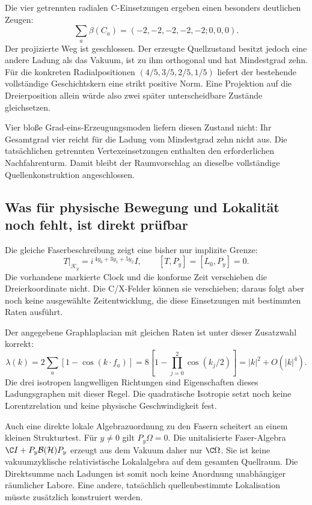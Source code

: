 Die vier getrennten radialen C-Einsetzungen ergeben einen besonders deutlichen Zeugen:
\begin{equation}
\sum_a\beta(C_a)=(-2,-2,-2,-2,-2;0,0,0).
\end{equation}
Der projizierte Weg ist geschlossen. Der erzeugte Quellzustand besitzt jedoch eine andere Ladung als das Vakuum, ist zu ihm orthogonal und hat Mindestgrad zehn. Für die konkreten Radialpositionen
$(4/5,3/5,2/5,1/5)$ liefert der bestehende vollständige Geschichtskern eine strikt positive Norm. Eine Projektion auf die Dreierposition allein würde also zwei später unterscheidbare Zustände gleichsetzen.

Vier bloße Grad-eins-Erzeugungsmoden liefern diesen Zustand nicht: Ihr Gesamtgrad vier reicht für die Ladung vom Mindestgrad zehn nicht aus. Die tatsächlichen getrennten Vertexeinsetzungen enthalten den erforderlichen Nachfahrenturm. Damit bleibt der Raumvorschlag an dieselbe vollständige Quellenkonstruktion angeschlossen.

\subsection{Was für physische Bewegung und Lokalität noch fehlt, ist direkt prüfbar}
Die gleiche Faserbeschreibung zeigt eine bisher nur implizite Grenze:
\begin{equation}
T|_{\mathcal K_y}=i^{\,4y_0+3y_1+5y_2}I,\qquad
[T,P_y]=[L_0,P_y]=0.
\end{equation}
Die vorhandene markierte Clock und die konforme Zeit verschieben die Dreierkoordinate nicht. Die C/X-Felder können sie verschieben; daraus folgt aber noch keine ausgewählte Zeitentwicklung, die diese Einsetzungen mit bestimmten Raten ausführt.

Der angegebene Graphlaplacian mit gleichen Raten ist unter dieser Zusatzwahl korrekt:
\begin{equation}
\lambda(k)=2\sum_a[1-\cos(k\cdot f_a)]
=8\left[1-\prod_{j=0}^2\cos(k_j/2)\right]
=|k|^2+O(|k|^4).
\end{equation}
Die drei isotropen langwelligen Richtungen sind Eigenschaften dieses Ladungsgraphen mit dieser Regel. Die quadratische Isotropie setzt noch keine Lorentzrelation und keine physische Geschwindigkeit fest.

Auch eine direkte lokale Algebrazuordnung zu den Fasern scheitert an einem kleinen Strukturtest. Für $y\ne0$ gilt $P_y\Omega=0$. Die unitalisierte Faser-Algebra
$\C I+P_y\mathcal B(\mathcal H)P_y$ erzeugt aus dem Vakuum daher nur $\C\Omega$. Sie ist keine vakuumzyklische relativistische Lokalalgebra auf dem gesamten Quellraum. Die Direktsumme nach Ladungen ist somit noch keine Anordnung unabhängiger räumlicher Labore. Eine andere, tatsächlich quellenbestimmte Lokalisation müsste zusätzlich konstruiert werden.

